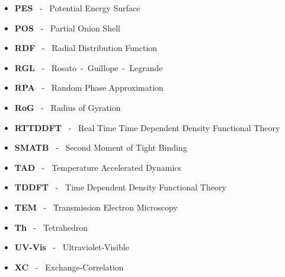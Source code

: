 \begin{itemize}
\item[]\textbf{PES} ~-~ Potential Energy Surface
\item[]\textbf{POS} ~-~ Partial Onion Shell
\item[]\textbf{RDF} ~-~ Radial Distribution Function
\item[]\textbf{RGL} ~-~ Rosato~-~Guillope~-~Legrande
\item[]\textbf{RPA} ~-~ Random Phase Approximation
\item[]\textbf{RoG} ~-~ Radius of Gyration
\item[]\textbf{RTTDDFT} ~-~ Real Time Time Dependent Density Functional Theory
\item[]\textbf{SMATB} ~-~ Second Moment of Tight Binding
\item[]\textbf{TAD} ~-~ Temperature Accelerated Dynamics
\item[]\textbf{TDDFT} ~-~ Time Dependent Density Functional Theory
\item[]\textbf{TEM} ~-~ Transmission Electron Microscopy
\item[]\textbf{Th} ~-~ Tetrahedron
\item[]\textbf{UV-Vis} ~-~ Ultraviolet-Visible
\item[]\textbf{XC} ~-~ Exchange-Correlation
\end{itemize}
